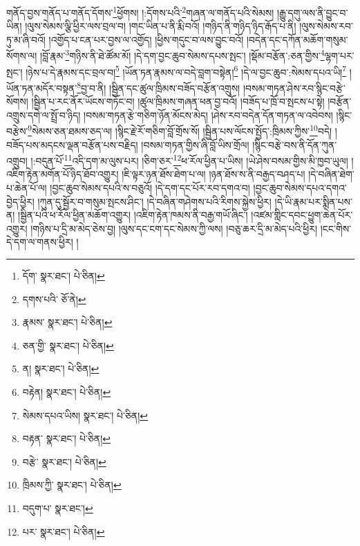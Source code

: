གནོད་བྱས་གནོད་པ་གནོད་དོགས་\footnote{དོག་  སྣར་ཐང་།  པེ་ཅིན། }ཕྱོགས། །:དོགས་པའི་\footnote{དགས་པའི་  ཅོ་ནེ། }གཞན་ལ་གནོད་པའི་སེམས། །རྒྱུ་དགུ་ལས་ནི་བྱུང་བ་ཡིན། །ལུས་སེམས་ལྕི་ཕྱིར་ལས་བྲལ་བ། །གང་ཡིན་པ་ནི་རྨི་བའོ། །གཉིད་ནི་གཉིད་ཉིད་རྒོད་པ་ནི། །ལུས་སེམས་རབ་ཏུ་མ་ཞི་བའོ། །འགྱོད་པ་ངན་པར་བྱས་ལ་འགྱོད། །ཕྱིས་གདུང་བ་ལས་བྱུང་བའོ། །བདེན་དང་དཀོན་མཆོག་གསུམ་སོགས་ལ། །བློ་རྣམ་\footnote{རྣམས་  སྣར་ཐང་།  པེ་ཅིན། }གཉིས་ནི་ཐེ་ཚོམ་མོ། །དེ་དག་བྱང་ཆུབ་སེམས་དཔས་སྤང་། །སྡོམ་བརྩོན་:ཅན་གྱིས་\footnote{ཅན་གྱི་  སྣར་ཐང་།  པེ་ཅིན། }ལྷག་པར་སྤང་། །ཉེས་པ་དེ་རྣམས་དང་བྲལ་བ།\footnote{ན།  སྣར་ཐང་།  པེ་ཅིན། } །ཡོན་ཏན་རྣམས་ལ་བདེ་བླག་བསྟེན།\footnote{བརྟེན།  སྣར་ཐང་།  པེ་ཅིན། } །དེ་ལ་བྱང་ཆུབ་:སེམས་དཔའ་ཡི།\footnote{སེམས་དཔའ་ཡིས།  སྣར་ཐང་།  པེ་ཅིན། } །ཡོན་ཏན་མདོར་བསྟན་\footnote{བརྟན་  སྣར་ཐང་།  པེ་ཅིན། }བྱ་བ་ནི། །སྦྱིན་དང་ཚུལ་ཁྲིམས་བཟོད་བརྩོན་འགྲུས། །བསམ་གཏན་ཤེས་རབ་སྙིང་བརྩེ་སོགས། །སྦྱིན་པ་རང་ནོར་ཡོངས་གཏོང་བ། །ཚུལ་ཁྲིམས་གཞན་ཕན་བྱ་བའོ། །བཟོད་པ་ཁྲོ་བ་སྤངས་པ་སྟེ། །བརྩོན་འགྲུས་དགེ་ལ་སྤྲོ་བ་ཉིད། །བསམ་གཏན་རྩེ་གཅིག་ཉོན་མོངས་མེད། །ཤེས་རབ་བདེན་དོན་གཏན་ལ་འབེབས། །སྙིང་བརྩེས་\footnote{བརྩེ་  སྣར་ཐང་།  པེ་ཅིན། }སེམས་ཅན་ཐམས་ཅད་ལ། །སྙིང་རྗེ་རོ་གཅིག་བློ་གྲོས་སོ། །སྦྱིན་པས་ལོངས་སྤྱོད་:ཁྲིམས་ཀྱིས་\footnote{ཁྲིམས་ཀྱི་  སྣར་ཐང་།  པེ་ཅིན། }བདེ། །བཟོད་པས་མདངས་ལྡན་བརྩོན་པས་བརྗིད། །བསམ་གཏན་གྱིས་ཞི་བློ་ཡིས་གྲོལ། །སྙིང་བརྩེ་བས་ནི་དོན་ཀུན་འགྲུབ། །:བདུན་པོ་\footnote{བདུག་པ་  སྣར་ཐང་། }འདི་དག་མ་ལུས་པར། །ཅིག་ཅར་\footnote{པར་  སྣར་ཐང་།  པེ་ཅིན། }ཕ་རོལ་ཕྱིན་པ་ཡིས། །ཡེ་ཤེས་བསམ་གྱིས་མི་ཁྱབ་ཡུལ། །འཇིག་རྟེན་མགོན་པོ་ཉིད་ཐོབ་འགྱུར། །ཇི་ལྟར་ཉན་ཐོས་ཐེག་པ་ལ། །ཉན་ཐོས་ས་ནི་བརྒྱད་བཤད་པ། །དེ་བཞིན་ཐེག་པ་ཆེན་པོ་ལ། །བྱང་ཆུབ་སེམས་དཔའི་ས་བཅུའོ། །དེ་དག་དང་པོར་རབ་དགའ་བ། །བྱང་ཆུབ་སེམས་དཔའ་དགའ་བྱེད་ཕྱིར། །ཀུན་དུ་སྦྱོར་བ་གསུམ་སྤངས་ཤིང་། །དེ་བཞིན་གཤེགས་པའི་རིགས་སྐྱེས་ཕྱིར། །དེ་ཡི་རྣམ་པར་སྨིན་པས་ན། །སྦྱིན་པའི་ཕ་རོལ་ཕྱིན་མཆོག་འགྱུར། །འཇིག་རྟེན་ཁམས་ནི་བརྒྱ་གཡོ་ཞིང་། །འཛམ་གླིང་དབང་ཕྱུག་ཆེན་པོར་འགྱུར། །གཉིས་པ་དྲི་མ་མེད་ཅེས་བྱ། །ལུས་དང་ངག་དང་སེམས་ཀྱི་ལས། །བཅུ་ཆར་དྲི་མ་མེད་པའི་ཕྱིར། །ངང་གིས་དེ་དག་ལ་གནས་ཕྱིར། །
